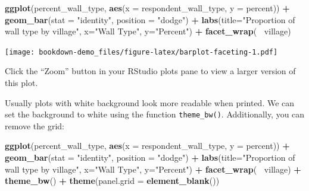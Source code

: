 \documentclass[]{book}
\newenvironment{Shaded}{\begin{snugshade}}{\end{snugshade}}
\newcommand{\KeywordTok}[1]{\textcolor[rgb]{0.13,0.29,0.53}{\textbf{#1}}}
\newcommand{\DataTypeTok}[1]{\textcolor[rgb]{0.13,0.29,0.53}{#1}}
\newcommand{\StringTok}[1]{\textcolor[rgb]{0.31,0.60,0.02}{#1}}
\newcommand{\OperatorTok}[1]{\textcolor[rgb]{0.81,0.36,0.00}{\textbf{#1}}}
\newcommand{\NormalTok}[1]{#1}
\begin{document}
\begin{Shaded}
\begin{Highlighting}[]
\KeywordTok{ggplot}\NormalTok{(percent_wall_type, }\KeywordTok{aes}\NormalTok{(}\DataTypeTok{x =}\NormalTok{ respondent_wall_type, }\DataTypeTok{y =}\NormalTok{ percent)) }\OperatorTok{+}
\StringTok{    }\KeywordTok{geom_bar}\NormalTok{(}\DataTypeTok{stat =} \StringTok{"identity"}\NormalTok{, }\DataTypeTok{position =} \StringTok{"dodge"}\NormalTok{) }\OperatorTok{+}
\StringTok{    }\KeywordTok{labs}\NormalTok{(}\DataTypeTok{title=}\StringTok{"Proportion of wall type by village"}\NormalTok{,}
         \DataTypeTok{x=}\StringTok{"Wall Type"}\NormalTok{,}
         \DataTypeTok{y=}\StringTok{"Percent"}\NormalTok{) }\OperatorTok{+}
\StringTok{    }\KeywordTok{facet_wrap}\NormalTok{(}\OperatorTok{~}\StringTok{ }\NormalTok{village)}
\end{Highlighting}
\end{Shaded}

\texttt{[image: bookdown-demo\_files/figure-latex/barplot-faceting-1.pdf]}

Click the ``Zoom'' button in your RStudio plots pane to view a larger
version of this plot.

Usually plots with white background look more readable when printed. We
can set the background to white using the function \texttt{theme\_bw()}.
Additionally, you can remove the grid:

\begin{Shaded}
\begin{Highlighting}[]
\KeywordTok{ggplot}\NormalTok{(percent_wall_type, }\KeywordTok{aes}\NormalTok{(}\DataTypeTok{x =}\NormalTok{ respondent_wall_type, }\DataTypeTok{y =}\NormalTok{ percent)) }\OperatorTok{+}
\StringTok{    }\KeywordTok{geom_bar}\NormalTok{(}\DataTypeTok{stat =} \StringTok{"identity"}\NormalTok{, }\DataTypeTok{position =} \StringTok{"dodge"}\NormalTok{) }\OperatorTok{+}
\StringTok{    }\KeywordTok{labs}\NormalTok{(}\DataTypeTok{title=}\StringTok{"Proportion of wall type by village"}\NormalTok{,}
         \DataTypeTok{x=}\StringTok{"Wall Type"}\NormalTok{,}
         \DataTypeTok{y=}\StringTok{"Percent"}\NormalTok{) }\OperatorTok{+}
\StringTok{    }\KeywordTok{facet_wrap}\NormalTok{(}\OperatorTok{~}\StringTok{ }\NormalTok{village) }\OperatorTok{+}
\StringTok{    }\KeywordTok{theme_bw}\NormalTok{() }\OperatorTok{+}
\StringTok{    }\KeywordTok{theme}\NormalTok{(}\DataTypeTok{panel.grid =} \KeywordTok{element_blank}\NormalTok{())}
\end{Highlighting}
\end{Shaded}
\end{document}
